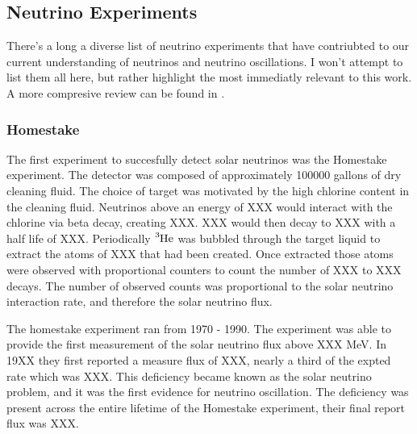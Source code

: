 \subsection{Neutrino Experiments}
There's a long a diverse list of neutrino experiments that have contriubted to
our current understanding of neutrinos and neutrino oscillations.
I won't attempt to list them all here, but rather highlight the most immediatly
relevant to this work. A more compresive review can be found in \citep{FINDAREVIEW}.

\subsubsection{Homestake}
The first experiment to succesfully detect solar neutrinos was the Homestake
experiment.
The detector was composed of approximately 100000 gallons of dry cleaning fluid.
The choice of target was motivated by the high chlorine content in the cleaning
fluid. Neutrinos above an energy of XXX would interact with the chlorine via
beta decay, creating XXX. XXX would then decay to XXX with a half life of XXX.
Periodically $\ce{^{3}He}$ was bubbled through the
target liquid to extract the atoms of XXX that had been created. Once
extracted those atoms were observed with proportional counters to count the
number of XXX to XXX decays. The number of observed counts was proportional
to the solar neutrino interaction rate, and therefore the solar neutrino flux.

The homestake experiment ran from 1970 - 1990. %
The experiment was able to provide the first measurement of the solar neutrino
flux above XXX MeV. In 19XX they first reported a measure flux of
XXX, nearly a third of the expted rate which was XXX.
This deficiency became known as the solar neutrino problem, and it
was the first evidence for neutrino oscillation.
The deficiency was present across the entire lifetime of the Homestake experiment,
their final report flux was XXX.

